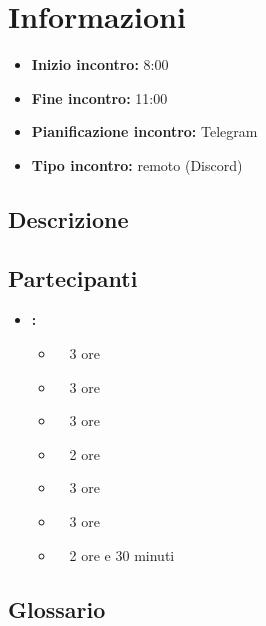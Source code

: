 \section{Informazioni}
\begin{itemize}
	\item \textbf{Inizio incontro:} 8:00
	\item \textbf{Fine incontro:} 11:00
	\item \textbf{Pianificazione incontro:} Telegram
	\item \textbf{Tipo incontro:} remoto (Discord)
\end{itemize}

\subsection{Descrizione}
\DocDescription

\subsection{Partecipanti}

\begin{itemize}
	\item \textbf{\GroupName:}
	\begin{itemize}
		\item \tommaso \ \rightarrow\ 3 ore
		\item \marco \ \rightarrow\ 3 ore
		\item \raul \ \rightarrow\ 3 ore
		\item \sebastiano \ \rightarrow\ 2 ore
		\item \martina \ \rightarrow\ 3 ore
		\item \riccardo \ \rightarrow\ 3 ore
		\item \mattia \ \rightarrow\ 2 ore e 30 minuti
	\end{itemize}
\end{itemize}

\subsection{Glossario}
\GlossarioIntroduzione

\clearpage
